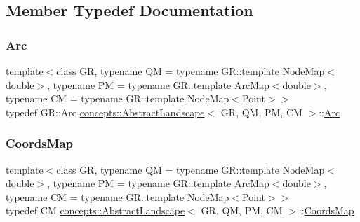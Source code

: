 \subsection{Member Typedef Documentation}
\mbox{\label{classconcepts_1_1_abstract_landscape_a0966623f028fe50ac9a3ae114dcf2672}} 
\subsubsection{\texorpdfstring{Arc}{Arc}}
{\footnotesize\ttfamily template$<$class GR, typename QM = typename G\+R\+::template Node\+Map$<$double$>$, typename PM = typename G\+R\+::template Arc\+Map$<$double$>$, typename CM = typename G\+R\+::template Node\+Map$<$\+Point$>$$>$ \\
typedef G\+R\+::\+Arc \hyperlink{classconcepts_1_1_abstract_landscape}{concepts\+::\+Abstract\+Landscape}$<$ GR, QM, PM, CM $>$\+::\hyperlink{classconcepts_1_1_abstract_landscape_a0966623f028fe50ac9a3ae114dcf2672}{Arc}}

\mbox{\label{classconcepts_1_1_abstract_landscape_a8432d7dff7edc5a5cbc524592b411f8a}} 
\subsubsection{\texorpdfstring{Coords\+Map}{CoordsMap}}
{\footnotesize\ttfamily template$<$class GR, typename QM = typename G\+R\+::template Node\+Map$<$double$>$, typename PM = typename G\+R\+::template Arc\+Map$<$double$>$, typename CM = typename G\+R\+::template Node\+Map$<$\+Point$>$$>$ \\
typedef CM \hyperlink{classconcepts_1_1_abstract_landscape}{concepts\+::\+Abstract\+Landscape}$<$ GR, QM, PM, CM $>$\+::\hyperlink{classconcepts_1_1_abstract_landscape_a8432d7dff7edc5a5cbc524592b411f8a}{Coords\+Map}}

\mbox{\label{classconcepts_1_1_abstract_landscape_ab1988ca4ff36329c45af21e76046903d}} 
